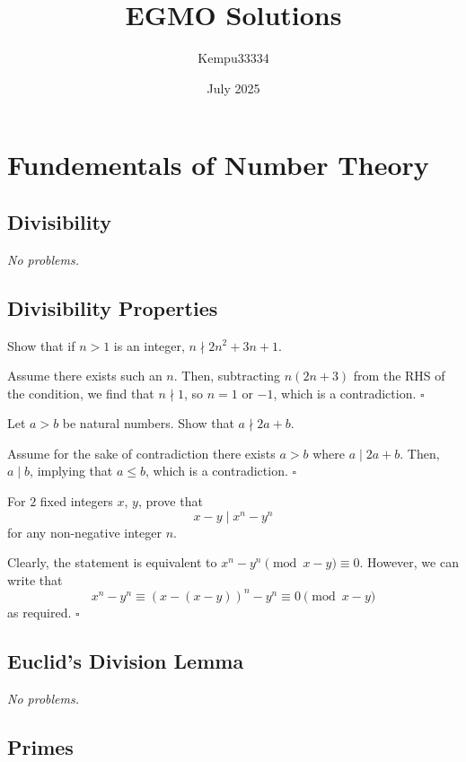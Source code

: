 \documentclass{article}
\title{EGMO Solutions}
\author{Kempu33334}
\date{July 2025}
\begin{document}
\maketitle

\tableofcontents

\newpage

\section{Fundementals of Number Theory}

\subsection{Divisibility}

\emph{No problems.}

\subsection{Divisibility Properties}

\begin{problem}[1.2.1]{}
Show that if $n > 1$ is an integer, $n \nmid 2n^2 + 3n + 1$.
\end{problem}
Assume there exists such an $n$. Then, subtracting $n(2n+3)$ from the RHS of the condition, we find that $n \nmid 1$, so $n = 1$ or $-1$, which is a contradiction. $\square$

\begin{problem}[1.2.2]{}
Let $a > b$ be natural numbers. Show that $a \nmid 2a + b$.
\end{problem}
Assume for the sake of contradiction there exists $a > b$ where $a \mid 2a+b$. Then, $a \mid b$, implying that $a \le b$, which is a contradiction. $\square$

\begin{problem}[1.2.3]{}
For $2$ fixed integers $x$, $y$, prove that \[x-y \mid x^n-y^n\] for any non-negative integer $n$.
\end{problem}
Clearly, the statement is equivalent to $x^n-y^n \pmod{x-y} \equiv 0$. However, we can write that \[x^n-y^n \equiv (x-(x-y))^n-y^n \equiv 0 \pmod{x-y}\] as required. $\square$

\subsection{Euclid’s Division Lemma}

\emph{No problems.}

\subsection{Primes}
\end{document}

